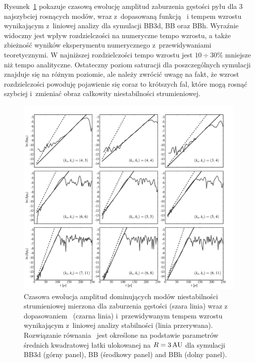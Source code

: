 \par Rysunek~\ref{fig8} pokazuje czasową ewolucję amplitud zaburzenia gęstości
pyłu dla 3 najszybciej rosnących modów, wraz z~dopasowaną funkcją~
i tempem wzrostu wynikającym z~liniowej analizy dla symulacji BB3d, BB oraz BBh.
Wyraźnie widoczny jest wpływ rozdzielczości na numeryczne tempo wzrostu, a także
zbieżność wyników eksperymentu numerycznego z~przewidywaniami teoretycznymi. W
najniższej rozdzielczości tempo wzrostu jest $10\div30\%$ mniejsze niż tempo
analityczne. Ostateczny poziom saturacji dla poszczególnych symulacji znajduje
się na różnym poziomie, ale należy zwrócić uwagę na fakt, że wzrost
rozdzielczości powoduję pojawienie się coraz to krótszych fal, które mogą rosnąć
szybciej i~zmieniać obraz całkowity niestabilności strumieniowej.
 
\begin{figure} \includegraphics[width=0.98\linewidth]{figures/fig8}
   \caption{Czasowa ewolucja amplitud dominujących modów niestabilności
      strumieniowej mierzona dla zaburzenia gęstości (szara linia) wraz z
      dopasowaniem~ (czarna linia) i~przewidywanym tempem wzrostu
      wynikającym z~liniowej analizy stabilności (linia przerywana).
      Rozwiązanie równania~ jest określone na podstawie
      parametrów średnich kwadratowej łatki ulokowanej na $R=3\hbox{$\thinspace\textrm{AU}$}$ dla symulacji
BB3d (górny panel), BB (środkowy panel) and BBh (dolny panel).  } \label{fig8}
\end{figure}

